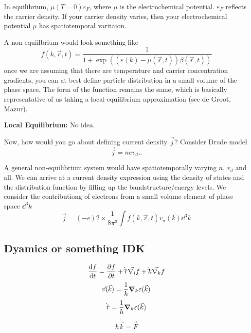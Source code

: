 \documentclass[a4paper]{article}
\begin{document}
In equilibrium, $\mu(T=0) \varepsilon_F$, where $\mu$ is the electrochemical potential.
$\varepsilon_F$ reflects the carrier density. If your carrier density
varies, then your electrochemical potential $\mu$ has spatiotemporal
varitaion.

A non-equiilbrium would look something like
\begin{equation}
	f(k,\vec{r},t) = \frac{1}{1 + \exp\left(\left( \varepsilon(k) - \mu(\vec r,t) \right)\beta(\vec{r}, t)\right) }
\end{equation}
once we are assuming that there are temperature and carrier concentration
gradients, you can at best define particle distribution in a small
volume of the phase space. The form of the function remains the same,
which is basically representative of us taking a local-equilibrium
approximation (see de Groot, Mazur).

\textbf{Local Equilibrium:} No idea.

Now, how would you go about defining current density $\vec{j}$?
Consider Drude model
\[
\vec{j} = nev_d.
.\] 

A general non-equilibrium system would have spatiotemporally varying
$n$, $v_d$ and all. We can arrive at a current density expression using
the density of states and the distribution function by filling up the
bandstructure/energy levels. We consider the contributiong of electrons
from a small volume element of phase space  $\dd ^3 k$
\begin{equation} \label{current_density}
	\vec{j} = (-e)2\times \frac{1}{8\pi^3}\int f(k, \vec{r}, t)v_n(k)\dd^3k
\end{equation}

\subsection*{Dyamics or something IDK}
\begin{equation}
	\frac{\dd f}{\dd t} = \pdv{f}{t} + \dot\vec r \vec{\nabla_i}f + \dot\vec{k}\vec{\nabla_k}f
\end{equation}
\begin{equation}
	\vec{v}(\vec{k}) = \frac{1}{\hbar}\grad_k\varepsilon(\vec{k})
\end{equation}
\begin{equation}
	\dot\vec{r} = \frac{1}{\hbar} \grad_k\varepsilon(\vec{k})
\end{equation}
\begin{equation}
	\hbar \dot{\vec{k}} = \vec{F}
\end{equation}
\end{document}
